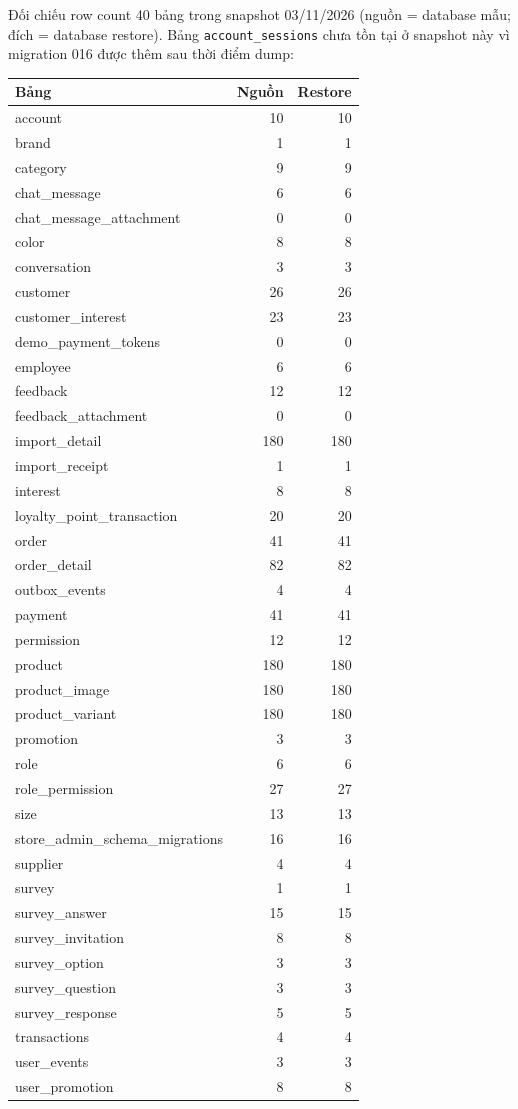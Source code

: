 Đối chiếu row count 40 bảng trong snapshot 03/11/2026 (nguồn = database mẫu; đích = database restore). Bảng \texttt{account\_sessions} chưa tồn tại ở snapshot này vì migration 016 được thêm sau thời điểm dump:
\scriptsize
\begin{longtable}{|p{}|r|r|}\hline
\textbf{Bảng}&\textbf{Nguồn}&\textbf{Restore}\\\hline\endhead
account&10&10\\\hline
brand&1&1\\\hline
category&9&9\\\hline
chat\_message&6&6\\\hline
chat\_message\_attachment&0&0\\\hline
color&8&8\\\hline
conversation&3&3\\\hline
customer&26&26\\\hline
customer\_interest&23&23\\\hline
demo\_payment\_tokens&0&0\\\hline
employee&6&6\\\hline
feedback&12&12\\\hline
feedback\_attachment&0&0\\\hline
import\_detail&180&180\\\hline
import\_receipt&1&1\\\hline
interest&8&8\\\hline
loyalty\_point\_transaction&20&20\\\hline
order&41&41\\\hline
order\_detail&82&82\\\hline
outbox\_events&4&4\\\hline
payment&41&41\\\hline
permission&12&12\\\hline
product&180&180\\\hline
product\_image&180&180\\\hline
product\_variant&180&180\\\hline
promotion&3&3\\\hline
role&6&6\\\hline
role\_permission&27&27\\\hline
size&13&13\\\hline
store\_admin\_schema\_migrations&16&16\\\hline
supplier&4&4\\\hline
survey&1&1\\\hline
survey\_answer&15&15\\\hline
survey\_invitation&8&8\\\hline
survey\_option&3&3\\\hline
survey\_question&3&3\\\hline
survey\_response&5&5\\\hline
transactions&4&4\\\hline
user\_events&3&3\\\hline
user\_promotion&8&8\\\hline
\end{longtable}
\normalsize

